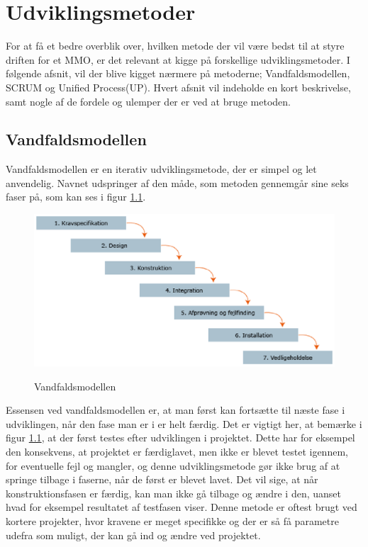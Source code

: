 \chapter{Udviklingsmetoder}
For at få et bedre overblik over, hvilken metode der vil være bedst til at styre driften for et MMO, er det relevant at kigge på forskellige udviklingsmetoder. I følgende afsnit, vil der blive kigget nærmere på metoderne; Vandfaldsmodellen, SCRUM og Unified Process(UP). Hvert afsnit vil indeholde en kort beskrivelse, samt nogle af de fordele og ulemper der er ved at bruge metoden.\\
\section{Vandfaldsmodellen}
Vandfaldsmodellen er en iterativ udviklingsmetode, der er simpel og let anvendelig.\cite{Waterfall} 
Navnet udspringer af den måde, som metoden gennemgår sine seks faser på, som kan ses i figur \ref{dia:Vandfald}.\\

\begin{figure}[!h]
\centering
\begin{center}
\includegraphics[clip, trim = 0mm 100mm 100mm 10mm, scale = 1]{./vandfaldmodel.eps}
\caption{Vandfaldsmodellen} \cite{Vandfaldsmodellen}
\label{dia:Vandfald}
\end{center}
\end{figure}

Essensen ved vandfaldsmodellen er, at man først kan fortsætte til næste fase i udviklingen, når den fase man er i er helt færdig. Det er vigtigt her, at bemærke i figur \ref{dia:Vandfald}, at der først testes efter udviklingen i projektet. Dette har for eksempel den konsekvens, at projektet er færdiglavet, men ikke er blevet testet igennem, for eventuelle fejl og mangler, og denne udviklingsmetode gør ikke brug af at springe tilbage i faserne, når de først er blevet lavet.
Det vil sige, at når konstruktionsfasen er færdig, kan man ikke gå tilbage og ændre i den, uanset hvad for eksempel resultatet af testfasen viser. Denne metode er oftest brugt ved kortere projekter, hvor kravene er meget specifikke og der er så få parametre udefra som muligt, der kan gå ind og ændre ved projektet.\\


